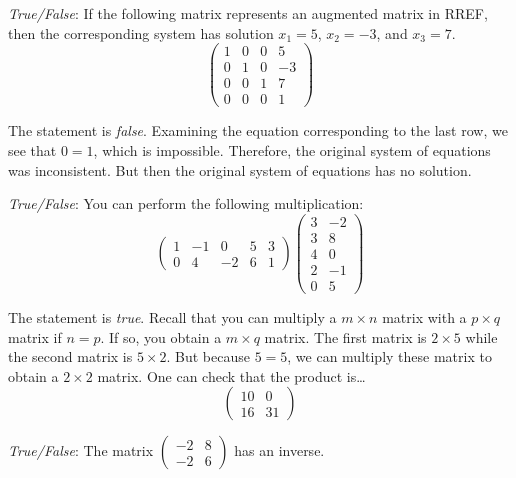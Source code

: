 \documentclass[11pt,letterpaper]{article}
\begin{document}
\quizsol \textit{True/False}: If the following matrix represents an augmented matrix in RREF, then the corresponding system has solution $x_1= 5$, $x_2= -3$, and $x_3= 7$.
	\[
	\begin{pmatrix}
	1 & 0 & 0 & 5 \\
	0 & 1 & 0 & -3 \\
	0 & 0 & 1 & 7 \\
	0 & 0 & 0 & 1
	\end{pmatrix}
	\]

\sol The statement is \textit{false}. Examining the equation corresponding to the last row, we see that $0= 1$, which is impossible. Therefore, the original system of equations was inconsistent. But then the original system of equations has no solution. 



\newpage



\quizsol \textit{True/False}: You can perform the following multiplication:
	\[
	\begin{pmatrix}
	1 & -1 & 0 & 5 & 3 \\
	0 & 4 & -2 & 6 & 1
	\end{pmatrix}
	\begin{pmatrix}
	3 & -2 \\
	3 & 8 \\
	4 & 0 \\
	2 & -1 \\
	0 & 5
	\end{pmatrix}
	\] \pspace

\sol The statement is \textit{true}. Recall that you can multiply a $m \times n$ matrix with a $p \times q$ matrix if $n= p$. If so, you obtain a $m \times q$ matrix. The first matrix is $2 \times 5$ while the second matrix is $5 \times 2$. But because $5= 5$, we can multiply these matrix to obtain a $2 \times 2$ matrix. One can check that the product is\dots
	\[
	\begin{pmatrix}
	10 & 0 \\
	16 & 31
	\end{pmatrix}
	\] \pvspace{1.5cm}



\quizsol \textit{True/False}: The matrix $\begin{pmatrix} -2 & 8 \\ -2 & 6 \end{pmatrix}$ has an inverse. \pspace
\end{document}
